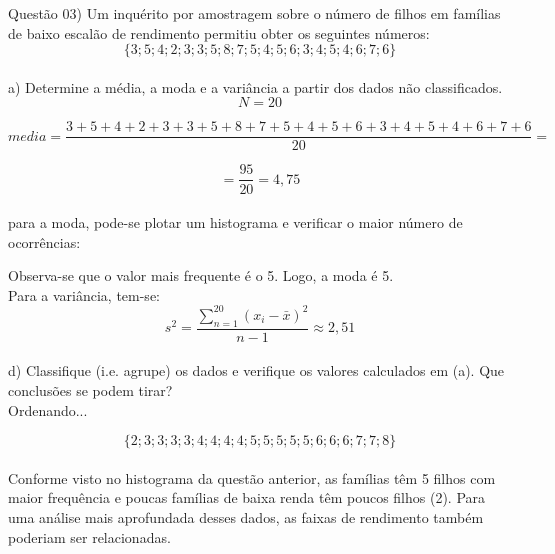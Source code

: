 
\noindent \textcolor{COLOR1}{Questão 03)} Um inquérito por amostragem sobre o número de filhos em famílias de baixo escalão de
rendimento permitiu obter os seguintes números:
\\

\[
    \{ 3; 5; 4; 2; 3; 3; 5; 8; 7; 5; 4; 5; 6; 3; 4; 5; 4; 6; 7; 6\}
\]
\\

a) Determine a média, a moda e a variância a partir dos dados não classificados.
\\

\[N=20\]

\[
    media = \frac{3+5+4+2+3+3+5+8+7+5+4+5+6+3+4+5+4+6+7+6}{20} =
\]

\[
    =\frac{95}{20} = 4,75
\]
\\

para a moda, pode-se plotar um histograma e verificar o maior número de ocorrências:



Observa-se que o valor mais frequente é o 5. Logo, a moda é 5.
\\

Para a variância, tem-se:
\\

\[
    s^2 = \frac{\sum_{n = 1}^{20} \left(x_i-\bar{x}\right)^2}{n-1} \approx 2,51
\]
\\

d) Classifique (i.e. agrupe) os dados e verifique os valores calculados em (a). Que conclusões se podem tirar?
\\

Ordenando...

\[
    \{ 2;3;3;3;3;4;4;4;4;5;5;5;5;5;6;6;6;7;7;8\}
\]
\\

Conforme visto no histograma da questão anterior, as famílias têm 5 filhos com maior frequência e poucas famílias de baixa renda têm poucos filhos (2). Para uma análise mais aprofundada desses dados, as faixas de rendimento também poderiam ser relacionadas.
\\

